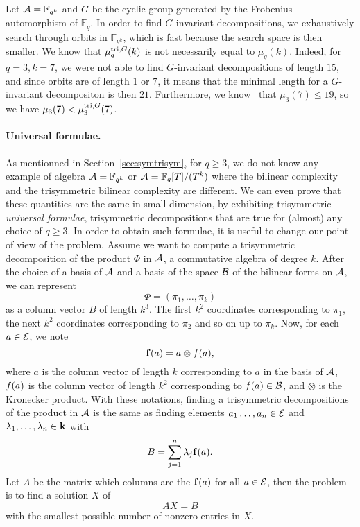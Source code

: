 \documentclass[11pt]{article}
\begin{document}
Let $\mathcal{A}=\mathbb{F}_{q^k}$ and $G$ be the cyclic group generated by the Frobenius
automorphism of $\mathbb{F}_{q}$. In order to find $G$-invariant decompositions,
we exhaustively search through orbits in $\mathbb{F}_{q^k}$, which is fast
because the search space is then smaller. We know that $\mu^{\textrm{tri},G}_q(k)$ is not
necessarily equal to $\mu_q(k)$. Indeed, for $q=3, k=7$, we were not able to
find $G$-invariant decompositions of length $15$, and since orbits are of length
$1$ or $7$, it means that the minimal length for a $G$-invariant decompositon is
then $21$. Furthermore, we know~\cite{BCPRRR19} that $\mu_3(7)\leq19$, so we
have $\mu_3(7)<\mu^{\textrm{tri},G}_3(7)$.

\paragraph{Universal formulae.}
As mentionned in Section~\ref{sec:symtrisym}, for $q\geq3$, we do not know any example of
algebra $\mathcal{A}=\mathbb{F}_{q^k}$ or $\mathcal{A}=\mathbb{F}_{q}[T]/(T^k)$ where the bilinear complexity and
the trisymmetric bilinear complexity are different. We can even prove that these
quantities are the same in small dimension, by exhibiting trisymmetric \emph{universal
formulae}, \ie trisymmetric decompositions that are true for (almost) any choice
of $q\geq3$. In order to obtain such formulae, it is useful to
change our point of view of the problem. Assume we want to compute a
trisymmetric decomposition of the product $\Phi$ in $\mathcal{A}$, a commutative algebra
of degree $k$. After the choice of a basis of $\mathcal{A}$ and a basis of the space $\mathcal{B}$
of the bilinear forms on $\mathcal{A}$, we can represent
\[
  \Phi=(\pi_1, \dots, \pi_k)
\]
as a column vector $B$ of length $k^3$. The first $k^2$ coordinates corresponding
to $\pi_1$, the next $k^2$ coordinates corresponding to $\pi_2$ and so on up to
$\pi_k$. Now, for each $a\in\mathcal{E}$, we note
\[
  \mathbf{f}(a) = a\otimes f(a),
\] 
where $a$ is the column vector of length $k$ corresponding to $a$ in the basis
of $\mathcal{A}$, $f(a)$ is the column vector of length $k^2$ corresponding
to $f(a)\in\mathcal{B}$, and $\otimes$ is the Kronecker product. With these notations,
finding a trisymmetric decompositions of the product in
$\mathcal{A}$ is the same as finding elements $a_1\dots,
a_n\in\mathcal{E}$ and $\lambda_1, \dots, \lambda_n\in\mathbf{k}$ with
\[
  B = \sum_{j=1}^n \lambda_j\mathbf{f}(a).
\]
Let $A$ be the matrix which columns are the $\mathbf{f}(a)$ for all $a\in\mathcal{E}$, then the
problem is to find a solution $X$ of
\[
  AX = B
\]
with the smallest possible number of nonzero entries in $X$.
\end{document}
